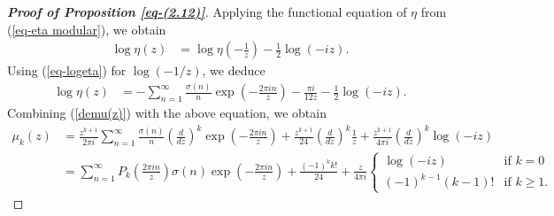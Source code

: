 \documentclass[11pt]{amsart}
\theoremstyle{plain}
\numberwithin{equation}{section}
\begin{document}
	\begin{proof}[\textbf{\boldmath Proof of Proposition \ref{eq-(2.12)}}]
		Applying the functional equation of $\eta$ from (\ref{eq-eta modular}), we obtain
		\begin{align*}
			\log\eta(z)&=\log\eta\left(-\frac{1}{z}\right)-\frac{1}{2}\log(-iz).
		\end{align*}
		Using (\ref{eq-logeta}) for $\log(-1/z)$, we deduce
		\begin{align*}
			\log\eta(z)&=-\sum_{n=1}^{\infty}\frac{\sigma(n)}{n}\exp\left(-\frac{2\pi in}{z}\right)-\frac{\pi i}{12z}-\frac{1}{2}\log (-iz).
		\end{align*}
		Combining (\ref{demu(z)}) with the above equation, we obtain
		\begin{align*}
			\mu_{k}(z)&=\frac{z^{k+1}}{2\pi i}\sum_{n=1}^{\infty}\frac{\sigma(n)}{n}\left(\frac{d}{dz}\right)^{k} \exp\left(-\frac{2\pi in}{z}\right)+\frac{z^{k+1}}{24}\left(\frac{d}{dz}\right)^{k} \frac{1}{z}+\frac{z^{k+1}}{4\pi i} \left(\frac{d}{dz}\right)^{k} \log(-iz) \\
			&=\sum_{n=1}^{\infty}P_{k}\left(\frac{2\pi in}{z}\right)\sigma(n)\exp\left(-\frac{2\pi in}{z}\right)+\frac{(-1)^{k}k!}{24}+\frac{z}{4\pi i}\begin{cases} 
				\log(-iz) & \text{if } k=0 \\ 
				(-1)^{k-1}(k-1)! & \mbox{if } k\ge 1. 
			\end{cases}
		\end{align*}
	\end{proof}
\end{document}
